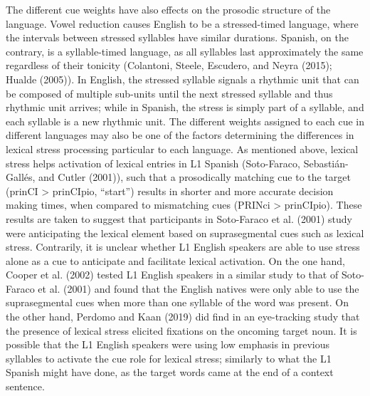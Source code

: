 \documentclass[english,man]{apa6}
\begin{document}
The different cue weights have also effects on the prosodic structure of the language. Vowel reduction causes English to be a stressed-timed language, where the intervals between stressed syllables have similar durations. Spanish, on the contrary, is a syllable-timed language, as all syllables last approximately the same regardless of their tonicity (Colantoni, Steele, Escudero, and Neyra (2015); Hualde (2005)). In English, the stressed syllable signals a rhythmic unit that can be composed of multiple sub-units until the next stressed syllable and thus rhythmic unit arrives; while in Spanish, the stress is simply part of a syllable, and each syllable is a new rhythmic unit.
The different weights assigned to each cue in different languages may also be one of the factors determining the differences in lexical stress processing particular to each language. As mentioned above, lexical stress helps activation of lexical entries in L1 Spanish (Soto-Faraco, Sebastián-Gallés, and Cutler (2001)), such that a prosodically matching cue to the target (prinCI \textgreater{} prinCIpio, \enquote{start}) results in shorter and more accurate decision making times, when compared to mismatching cues (PRINci \textgreater{} prinCIpio). These results are taken to suggest that participants in Soto-Faraco et al. (2001) study were anticipating the lexical element based on suprasegmental cues such as lexical stress. Contrarily, it is unclear whether L1 English speakers are able to use stress alone as a cue to anticipate and facilitate lexical activation. On the one hand, Cooper et al. (2002) tested L1 English speakers in a similar study to that of Soto-Faraco et al. (2001) and found that the English natives were only able to use the suprasegmental cues when more than one syllable of the word was present. On the other hand, Perdomo and Kaan (2019) did find in an eye-tracking study that the presence of lexical stress elicited fixations on the oncoming target noun. It is possible that the L1 English speakers were using low emphasis in previous syllables to activate the cue role for lexical stress; similarly to what the L1 Spanish might have done, as the target words came at the end of a context sentence.
\end{document}
